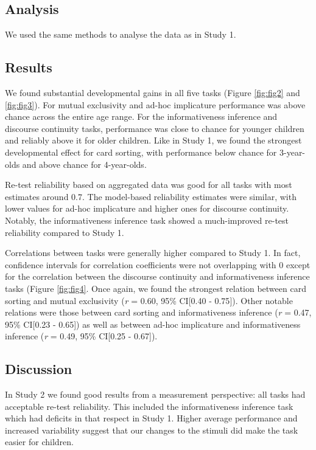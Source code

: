 \documentclass[
  man,floatsintext]{apa6}
\begin{document}
\hypertarget{analysis-1}{%
\subsection{Analysis}\label{analysis-1}}

We used the same methods to analyse the data as in Study 1.

\hypertarget{results-1}{%
\subsection{Results}\label{results-1}}

We found substantial developmental gains in all five tasks (Figure \ref{fig:fig2} and \ref{fig:fig3}). For mutual exclusivity and ad-hoc implicature performance was above chance across the entire age range. For the informativeness inference and discourse continuity tasks, performance was close to chance for younger children and reliably above it for older children. Like in Study 1, we found the strongest developmental effect for card sorting, with performance below chance for 3-year-olds and above chance for 4-year-olds.

Re-test reliability based on aggregated data was good for all tasks with most estimates around 0.7. The model-based reliability estimates were similar, with lower values for ad-hoc implicature and higher ones for discourse continuity. Notably, the informativeness inference task showed a much-improved re-test reliability compared to Study 1.

Correlations between tasks were generally higher compared to Study 1. In fact, confidence intervals for correlation coefficients were not overlapping with 0 except for the correlation between the discourse continuity and informativeness inference tasks (Figure \ref{fig:fig4}. Once again, we found the strongest relation between card sorting and mutual exclusivity (\emph{r} = 0.60, 95\% CI{[}0.40 - 0.75{]}). Other notable relations were those between card sorting and informativeness inference (\emph{r} = 0.47, 95\% CI{[}0.23 - 0.65{]}) as well as between ad-hoc implicature and informativeness inference (\emph{r} = 0.49, 95\% CI{[}0.25 - 0.67{]}).

\hypertarget{discussion-1}{%
\subsection{Discussion}\label{discussion-1}}

In Study 2 we found good results from a measurement perspective: all tasks had acceptable re-test reliability. This included the informativeness inference task which had deficits in that respect in Study 1. Higher average performance and increased variability suggest that our changes to the stimuli did make the task easier for children.
\end{document}
